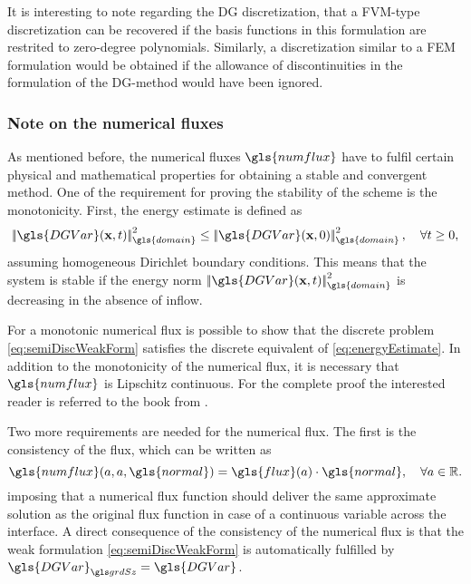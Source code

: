 It is interesting to note regarding the DG discretization, that a \gls{FVM}-type  discretization can be recovered if the basis functions in this formulation are restrited to zero-degree polynomials. Similarly, a discretization similar to a \gls{FEM} formulation would be obtained if the allowance of discontinuities in the formulation of the DG-method would have been ignored.
\subsubsection{Note on the numerical fluxes}
As mentioned before, the numerical fluxes $\gls{numflux}$ have to fulfil certain physical and mathematical properties for obtaining a stable and convergent method. One of the requirement for proving the stability of the scheme is the monotonicity. First, the energy estimate is defined as
\begin{equation}
	\norm{\gls{DGVar}(\vectr{x},t)}_{\gls{domain}}^2 \leq \norm{\gls{DGVar}(\vectr{x},0)}_{\gls{domain}}^2, \quad \forall t \geq 0,
	\label{eq:energyEstimate}
\end{equation}
assuming homogeneous Dirichlet boundary conditions. This means that the system is stable if the energy norm $\norm{\gls{DGVar}(\vectr{x},t)}_{\gls{domain}}^2 $ is  decreasing in the absence of inflow. 

For a monotonic numerical flux is possible to show that the discrete problem \cref{eq:semiDiscWeakForm} satisfies the discrete equivalent of \cref{eq:energyEstimate}. In addition to the monotonicity of the numerical flux, it is necessary that $\gls{numflux}$ is Lipschitz continuous.%
 For the complete proof the interested reader is referred to the book from \textcite{dipietroMathematicalAspectsDiscontinuous2012}.

Two more requirements are needed for the numerical flux. The first is the consistency of the flux, which can be written as
\begin{equation}
	\gls{numflux}(a,a,\gls{normal}) = \gls{flux}(a) \cdot \gls{normal}, \quad \forall a \in \mathbb{R}. 
	\label{eq:consistency}
\end{equation}
imposing that a numerical flux function should deliver the same approximate solution as the original flux function in case of a continuous variable across the interface. A direct consequence of the consistency of the numerical flux is that the weak formulation \cref{eq:semiDiscWeakForm} is automatically fulfilled by $\nuM{\gls{DGVar}} = \gls{DGVar}$.

